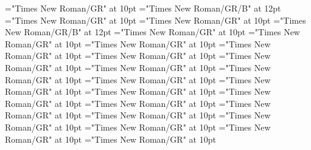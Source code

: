 \documentclass[gps1,twoside]{article}
\begin{document}
\font\spanowningentrysummarydefinitionvisiblecomplexformbackrefvisiblecomplexformbackrefsminorentrycomplexlastchildafter="Times New Roman/GR" at 10pt
\font\spanbzhheadwordminorentryvariant="Times New Roman/GR/B" at 12pt
\font\spanspanheadwordminorentryvariantbefore="Times New Roman/GR" at 10pt
\font\spanheadwordminorentryvariantlastchildafter="Times New Roman/GR" at 10pt
\font\spanheadwordminorentryvariant="Times New Roman/GR/B" at 12pt
\font\pronunciationpronunciationpronunciationsminorentryvariantbefore="Times New Roman/GR" at 10pt
\font\pronunciationsminorentryvariantafter="Times New Roman/GR" at 10pt
\font\spanspanformpronunciationpronunciationsminorentryvariantbefore="Times New Roman/GR" at 10pt
\font\spanformpronunciationpronunciationsminorentryvariantfirstchildbefore="Times New Roman/GR" at 10pt
\font\spanformpronunciationpronunciationsminorentryvariantlastchildafter="Times New Roman/GR" at 10pt
\font\spanspanvariantformentrybackrefsminorentryvariantbefore="Times New Roman/GR" at 10pt
\font\variantformentrybackrefsminorentryvariantbefore="Times New Roman/GR" at 10pt
\font\variantformentrybackrefsminorentryvariantafter="Times New Roman/GR" at 10pt
\font\variantentrytypevariantentrytypevariantentrytypesvariantformentrybackrefvariantformentrybackrefsminorentryvariantbefore="Times New Roman/GR" at 10pt
\font\variantentrytypesvariantformentrybackrefvariantformentrybackrefsminorentryvariantafter="Times New Roman/GR" at 10pt
\font\spanspanreverseabbrvariantentrytypevariantentrytypesvariantformentrybackrefvariantformentrybackrefsminorentryvariantbefore="Times New Roman/GR" at 10pt
\font\spanreverseabbrvariantentrytypevariantentrytypesvariantformentrybackrefvariantformentrybackrefsminorentryvariantlastchildafter="Times New Roman/GR" at 10pt
\font\spanspanheadwordvariantformentrybackrefvariantformentrybackrefsminorentryvariantbefore="Times New Roman/GR" at 10pt
\font\spanspanowningentrysummarydefinitionvariantformentrybackrefvariantformentrybackrefsminorentryvariantbefore="Times New Roman/GR" at 10pt
\font\spanowningentrysummarydefinitionvariantformentrybackrefvariantformentrybackrefsminorentryvariantlastchildafter="Times New Roman/GR" at 10pt
\font\spanspanvisiblevariantentryrefsminorentryvariantbefore="Times New Roman/GR" at 10pt
\font\visiblevariantentryrefsminorentryvariantafter="Times New Roman/GR" at 10pt
\font\variantentrytypevariantentrytypevariantentrytypesvisiblevariantentryrefvisiblevariantentryrefsminorentryvariantbefore="Times New Roman/GR" at 10pt
\font\variantentrytypesvisiblevariantentryrefvisiblevariantentryrefsminorentryvariantafter="Times New Roman/GR" at 10pt
\end{document}
